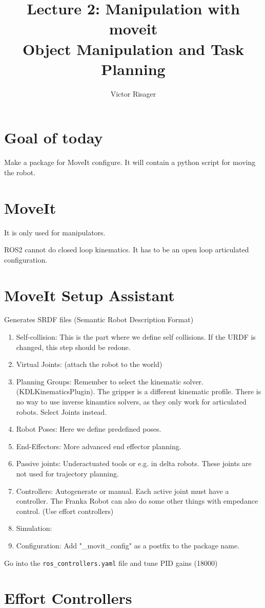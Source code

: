 \documentclass[a4paper]{article}
\title{Lecture 2: Manipulation with moveit  \\
	\large Object Manipulation and Task Planning}
\author{Victor Risager}
\begin{document}
\maketitle
\section{Goal of today}
Make a package for MoveIt configure. 
It will contain a python script for moving the robot.

\section{MoveIt}
It is only used for manipulators.

ROS2 cannot do closed loop kinematics. It has to be an open loop articulated configuration.

\section{MoveIt Setup Assistant}
Generates SRDF files (Semantic Robot Description Format)
\begin{enumerate}
	\item Self-collision: This is the part where we define self collisions. If the URDF is changed, this step should be redone. 
	\item Virtual Joints: (attach the robot to the world)
	\item Planning Groups: Remember to select the kinematic solver. (KDLKinematicsPlugin). The gripper is a different kinematic profile. There is no way to use inverse kinamtics solvers, as they only work for articulated robots. Select Joints instead. 
	\item Robot Poses: Here we define predefined poses. 
	\item End-Effectors: More advanced end effector planning.
	\item Passive joints: Underactuated tools or e.g. in delta robots. These joints are not used for trajectory planning. 
	\item Controllers: Autogenerate or manual. Each active joint must have a controller. The Franka Robot can also do some other things with empedance control. (Use effort controllers)
	\item Simulation: 
	\item Configuration: Add "\_movit\_config" as a postfix to the package name. 
\end{enumerate}

Go into the \texttt{ros\_controllers.yaml} file and tune PID gains (18000)

\section{Effort Controllers}
\end{document}
